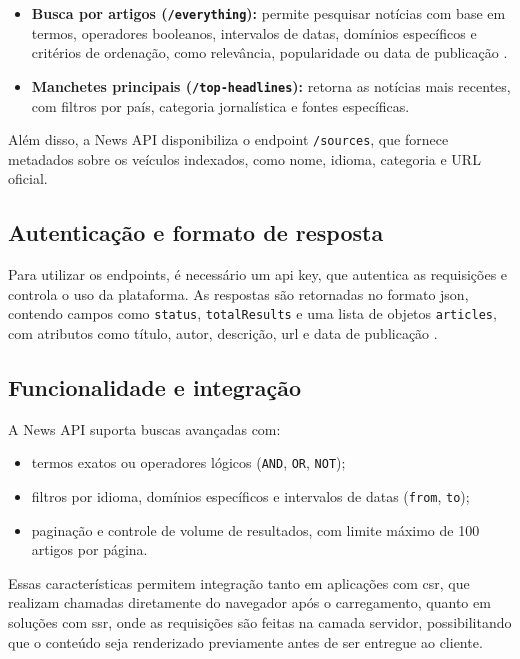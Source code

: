 \begin{itemize}
    \item \textbf{Busca por artigos (\texttt{/everything}):} permite pesquisar notícias com base em termos, operadores booleanos, intervalos de datas, domínios específicos e critérios de ordenação, como relevância, popularidade ou data de publicação \cite{newsapi_docs}.
    \item \textbf{Manchetes principais (\texttt{/top-headlines}):} retorna as notícias mais recentes, com filtros por país, categoria jornalística e fontes específicas.
\end{itemize}

Além disso, a News API disponibiliza o endpoint \texttt{/sources}, que fornece metadados sobre os veículos indexados, como nome, idioma, categoria e URL oficial.

\subsection{Autenticação e formato de resposta}
Para utilizar os endpoints, é necessário um \acrshort{api} key, que autentica as requisições e controla o uso da plataforma. As respostas são retornadas no formato \acrshort{json}, contendo campos como \texttt{status}, \texttt{totalResults} e uma lista de objetos \texttt{articles}, com atributos como título, autor, descrição, \acrshort{url} e data de publicação \cite{newsapi_docs}.

\subsection{Funcionalidade e integração}
A News API suporta buscas avançadas com:

\begin{itemize}
    \item termos exatos ou operadores lógicos (\texttt{AND}, \texttt{OR}, \texttt{NOT});
    \item filtros por idioma, domínios específicos e intervalos de datas (\texttt{from}, \texttt{to});
    \item paginação e controle de volume de resultados, com limite máximo de 100 artigos por página.
\end{itemize}

Essas características permitem integração tanto em aplicações com \acrshort{csr}, que realizam chamadas diretamente do navegador após o carregamento, quanto em soluções com \acrshort{ssr}, onde as requisições são feitas na camada servidor, possibilitando que o conteúdo seja renderizado previamente antes de ser entregue ao cliente.






